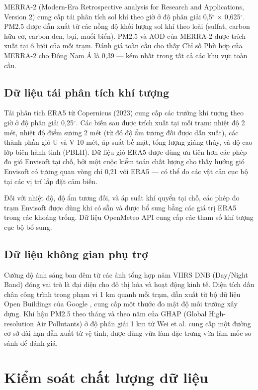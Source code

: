 MERRA-2 (Modern-Era Retrospective analysis for Research and Applications, Version 2) cung cấp tái phân tích sol khí theo giờ ở độ phân giải 0,5$^\circ$ $\times$ 0,625$^\circ$. PM2.5 được dẫn xuất từ các nồng độ khối lượng sol khí theo loài (sulfat, carbon hữu cơ, carbon đen, bụi, muối biển). PM2.5 và AOD của MERRA-2 được trích xuất tại ô lưới của mỗi trạm. Đánh giá toàn cầu cho thấy Chỉ số Phù hợp của MERRA-2 cho Đông Nam Á là 0,39 --- kém nhất trong tất cả các khu vực toàn cầu.

\subsection{Dữ liệu tái phân tích khí tượng}

Tái phân tích ERA5 từ Copernicus (2023) cung cấp các trường khí tượng theo giờ ở độ phân giải 0,25$^\circ$. Các biến sau được trích xuất tại mỗi trạm: nhiệt độ 2 mét, nhiệt độ điểm sương 2 mét (từ đó độ ẩm tương đối được dẫn xuất), các thành phần gió U và V 10 mét, áp suất bề mặt, tổng lượng giáng thủy, và độ cao lớp biên hành tinh (PBLH). Dữ liệu gió ERA5 được dùng ưu tiên hơn các phép đo gió Envisoft tại chỗ, bởi một cuộc kiểm toán chất lượng cho thấy hướng gió Envisoft có tương quan vòng chỉ 0,21 với ERA5 --- có thể do các vật cản cục bộ tại các vị trí lắp đặt cảm biến.

Đối với nhiệt độ, độ ẩm tương đối, và áp suất khí quyển tại chỗ, các phép đo trạm Envisoft được dùng khi có sẵn và được bổ sung bằng các giá trị ERA5 trong các khoảng trống. Dữ liệu OpenMeteo API cung cấp các tham số khí tượng cục bộ bổ sung.

\subsection{Dữ liệu không gian phụ trợ}

Cường độ ánh sáng ban đêm từ các ảnh tổng hợp năm VIIRS DNB (Day/Night Band) đóng vai trò là đại diện cho đô thị hóa và hoạt động kinh tế. Diện tích dấu chân công trình trong phạm vi 1 km quanh mỗi trạm, dẫn xuất từ bộ dữ liệu Open Buildings của Google \cite{google2023}, cung cấp một thước đo mật độ môi trường xây dựng. Khí hậu PM2.5 theo tháng và theo năm của GHAP (Global High-resolution Air Pollutants) ở độ phân giải 1 km từ Wei et al. \cite{wei2023} cung cấp một đường cơ sở dài hạn dẫn xuất từ vệ tinh, được dùng vừa làm đặc trưng vừa làm mốc so sánh để đánh giá.


\section{Kiểm soát chất lượng dữ liệu}

